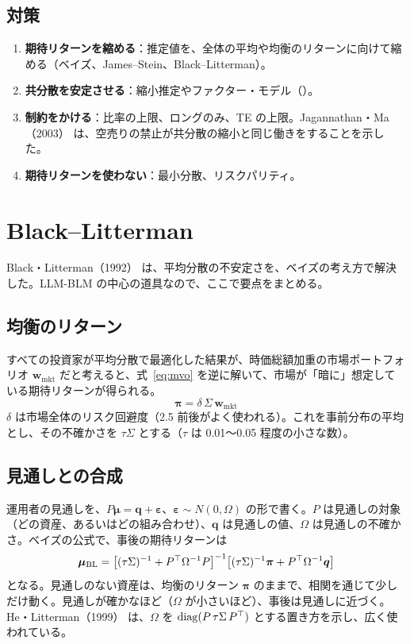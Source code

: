 \subsection{対策}

\begin{enumerate}
\item \textbf{期待リターンを縮める}：推定値を、全体の平均や均衡のリターンに向けて縮める（ベイズ、James--Stein、Black--Litterman）。
\item \textbf{共分散を安定させる}：縮小推定やファクター・モデル（）。
\item \textbf{制約をかける}：比率の上限、ロングのみ、TE の上限。Jagannathan・Ma（2003）\cite{jagannathanma2003} は、空売りの禁止が共分散の縮小と同じ働きをすることを示した。
\item \textbf{期待リターンを使わない}：最小分散、リスクパリティ。
\end{enumerate}

\section{Black--Litterman}
\label{sec:bl}

Black・Litterman（1992）\cite{blacklitterman1992} は、平均分散の不安定さを、ベイズの考え方で解決した。LLM-BLM の中心の道具なので、ここで要点をまとめる。

\subsection{均衡のリターン}

すべての投資家が平均分散で最適化した結果が、時価総額加重の市場ポートフォリオ $\bm w_{\text{mkt}}$ だと考えると、式~\eqref{eq:mvo} を逆に解いて、市場が「暗に」想定している期待リターンが得られる。
\begin{equation}
\bm\pi = \delta\,\Sigma\,\bm w_{\text{mkt}}
\end{equation}
$\delta$ は市場全体のリスク回避度（2.5 前後がよく使われる）。これを事前分布の平均とし、その不確かさを $\tau\Sigma$ とする（$\tau$ は 0.01〜0.05 程度の小さな数）。

\subsection{見通しとの合成}

運用者の見通しを、$P\bm\mu = \bm q + \bm\varepsilon$、$\bm\varepsilon \sim N(0, \Omega)$ の形で書く。$P$ は見通しの対象（どの資産、あるいはどの組み合わせ）、$\bm q$ は見通しの値、$\Omega$ は見通しの不確かさ。ベイズの公式で、事後の期待リターンは
\begin{equation}
\bm\mu_{\mathrm{BL}} = \big[(\tau\Sigma)^{-1} + P^{\top}\Omega^{-1}P\big]^{-1}\big[(\tau\Sigma)^{-1}\bm\pi + P^{\top}\Omega^{-1}\bm q\big]
\end{equation}
となる。見通しのない資産は、均衡のリターン $\bm\pi$ のままで、相関を通じて少しだけ動く。見通しが確かなほど（$\Omega$ が小さいほど）、事後は見通しに近づく。He・Litterman（1999）\cite{helitterman1999} は、$\Omega$ を $\mathrm{diag}(P\,\tau\Sigma\,P^{\top})$ とする置き方を示し、広く使われている。

